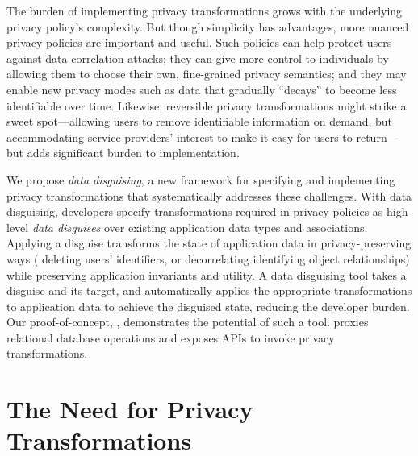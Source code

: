 %
The burden of implementing privacy transformations grows with the underlying privacy policy's
complexity.
%
But though simplicity has advantages, more nuanced privacy policies are important and useful.
%
Such policies can help protect users against data correlation attacks; they can give more
control to individuals by allowing them to choose their own, fine-grained privacy semantics; and
they may enable new privacy modes such as data that gradually ``decays'' to become less identifiable over time.
%
Likewise, reversible privacy transformations might strike a sweet
spot---allowing users to remove identifiable information on demand,
but accommodating service providers' interest to make it easy for users to return---but
adds significant burden to implementation.


%
%
%
%
We propose \emph{data disguising}, a new framework
for specifying and implementing privacy transformations that systematically addresses these
challenges.
%
With data disguising, developers specify transformations required in privacy policies as
high-level \emph{data disguises} over existing application data types and associations.
%
Applying a disguise transforms the state of application data in privacy-preserving ways (\eg
deleting users' identifiers, or decorrelating identifying object relationships) while preserving
application invariants and utility.
%
%
A data disguising tool takes a disguise and its target, and automatically applies the appropriate
transformations to application data to achieve the disguised state, reducing the developer burden.
%
Our proof-of-concept, \sys, demonstrates the potential of such a tool.
%
\sys proxies relational database operations and exposes APIs to invoke privacy transformations.
%

\section{The Need for Privacy Transformations}
\label{sec:survey}

